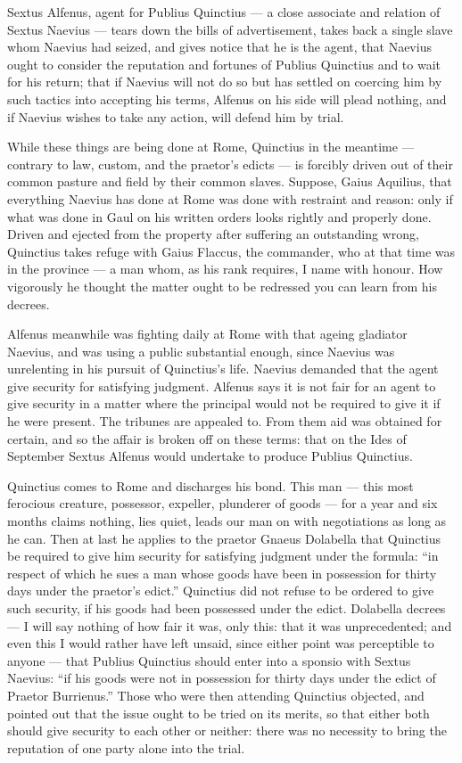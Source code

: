  Sextus Alfenus, agent for Publius Quinctius --- a close associate and relation of Sextus Naevius --- tears down the bills of advertisement, takes back a single slave whom Naevius had seized, and gives notice that he is the agent, that Naevius ought to consider the reputation and fortunes of Publius Quinctius and to wait for his return; that if Naevius will not do so but has settled on coercing him by such tactics into accepting his terms, Alfenus on his side will plead nothing, and if Naevius wishes to take any action, will defend him by trial.

 While these things are being done at Rome, Quinctius in the meantime --- contrary to law, custom, and the praetor's edicts --- is forcibly driven out of their common pasture and field by their common slaves. Suppose, Gaius Aquilius, that everything Naevius has done at Rome was done with restraint and reason: only if what was done in Gaul on his written orders looks rightly and properly done. Driven and ejected from the property after suffering an outstanding wrong, Quinctius takes refuge with Gaius Flaccus, the commander, who at that time was in the province --- a man whom, as his rank requires, I name with honour. How vigorously he thought the matter ought to be redressed you can learn from his decrees.

 Alfenus meanwhile was fighting daily at Rome with that ageing gladiator Naevius, and was using a public substantial enough, since Naevius was unrelenting in his pursuit of Quinctius's life. Naevius demanded that the agent give security for satisfying judgment. Alfenus says it is not fair for an agent to give security in a matter where the principal would not be required to give it if he were present. The tribunes are appealed to. From them aid was obtained for certain, and so the affair is broken off on these terms: that on the Ides of September Sextus Alfenus would undertake to produce Publius Quinctius.

 Quinctius comes to Rome and discharges his bond. This man --- this most ferocious creature, possessor, expeller, plunderer of goods --- for a year and six months claims nothing, lies quiet, leads our man on with negotiations as long as he can. Then at last he applies to the praetor Gnaeus Dolabella that Quinctius be required to give him security for satisfying judgment under the formula: ``in respect of which he sues a man whose goods have been in possession for thirty days under the praetor's edict.'' Quinctius did not refuse to be ordered to give such security, if his goods had been possessed under the edict. Dolabella decrees --- I will say nothing of how fair it was, only this: that it was unprecedented; and even this I would rather have left unsaid, since either point was perceptible to anyone --- that Publius Quinctius should enter into a sponsio with Sextus Naevius: ``if his goods were not in possession for thirty days under the edict of Praetor Burrienus.'' Those who were then attending Quinctius objected, and pointed out that the issue ought to be tried on its merits, so that either both should give security to each other or neither: there was no necessity to bring the reputation of one party alone into the trial.

